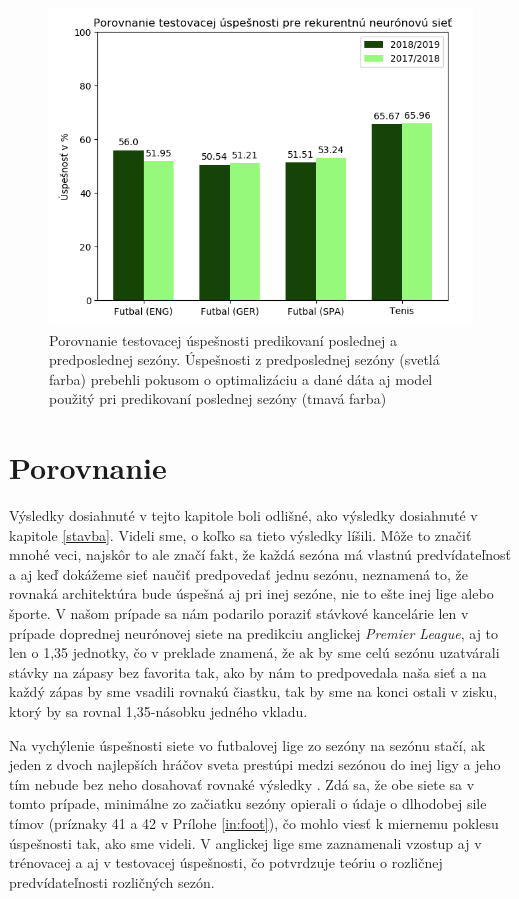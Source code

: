 \begin{figure}[h!]
    \includegraphics[width=\textwidth]{../img/rnn_bars.png} 
    \caption{Porovnanie testovacej úspešnosti predikovaní poslednej a predposlednej sezóny. Úspešnosti z predposlednej sezóny (svetlá farba) prebehli pokusom o optimalizáciu a dané dáta aj model použitý pri predikovaní poslednej sezóny (tmavá farba)}
    \label{fig12} 
\end{figure}

\section{Porovnanie}
Výsledky dosiahnuté v tejto kapitole boli odlišné, ako výsledky dosiahnuté v kapitole \ref{stavba}.
Videli sme, o koľko sa tieto výsledky líšili.
Môže to značiť mnohé veci, najskôr to ale značí fakt, že každá sezóna má vlastnú predvídateľnosť a aj keď dokážeme sieť naučiť predpovedať jednu sezónu, neznamená to, že rovnaká architektúra bude úspešná aj pri inej sezóne, nie to ešte inej lige alebo športe. V našom prípade sa nám podarilo poraziť stávkové kancelárie len v prípade doprednej neurónovej siete na pre\-dikciu anglickej \textit{Premier League}, aj to len o 1,35 jednotky, čo v preklade znamená, že ak by sme celú sezónu uzatvárali stávky na zápasy bez favorita tak, ako by nám to predpovedala naša sieť a na každý zápas by sme vsadili rovnakú čiastku, tak by sme na konci ostali v zisku, ktorý by sa rovnal 1,35-násobku jedného vkladu.

Na vychýlenie úspešnosti siete vo futbalovej lige zo sezóny na sezónu stačí, ak jeden z dvoch najlepších hráčov sveta prestúpi medzi sezónou do inej ligy a jeho tím nebude bez neho dosahovať rovnaké výsledky \citep{ronaldo}. 
Zdá sa, že obe siete sa v tomto prípade, minimálne zo začiatku sezóny opierali o údaje o dlhodobej sile tímov (príznaky 41 a 42 v Prílohe \ref{in:foot}), čo mohlo viesť k miernemu poklesu úspešnosti tak, ako sme videli.
V anglickej lige sme zaznamenali vzostup aj v trénovacej a aj v testovacej úspešnosti, čo potvrdzuje teóriu o rozličnej predvídateľnosti rozličných sezón.

